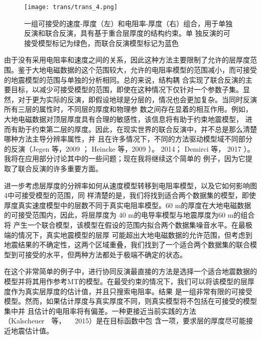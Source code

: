 \begin{figure}[H]
    \centering
    \texttt{[image: trans/trans\_4.png]}
    \caption[3.1.1]{一组可接受的速度-厚度（左）和电阻率-厚度（右）组合，用于单独反演和联合反演，具有基于重合层厚度的结构约束。单 独反演的可接受模型标记为绿色，而联合反演模型标记为蓝色}
\end{figure}


由于没有采用电阻率和速度之间的关系，因此这种方法主要限制了允许的层厚度范围。鉴于大地电磁数据的这个范围较大，允许的电阻率模型的范围减小，而可接受的地震模型的范围与单独的分析相同。总的来说，结构耦 合实现了联合反演的主要目标，以减少可接受模型的范围，即使在这种情况下仅针对一个参数子集。显然，对于更为实际的反演，即假设地球是分层的，情况也会更加复杂。当同时反演所有三层的属性时，不同层的厚度和物理参 数之间存在显着的相互作用。例如，大地电磁数据对顶层厚度具有合理的敏感性，该信息将有助于约束地震模型， 进而有助于约束第二层的厚度。因此，在现实世界的联合反演中，并不总是那么清楚哪种方法主导分辨率属性，并 且在许多情况下，不同的方法驱动模型域不同部分的反演（Jegen 等，2009 ； Heincke 等，2009 ）。 2014； Demirci 等， 2017 ）。我将在应用部分讨论其中的一些问题；现在我将继续这个简单的 例子，因为它提取了联合反演的许多重要方面。

进一步考虑层厚度的分辨率如何从速度模型转移到电阻率模型，以及它如何影响图4中可接受模型的范围，同 样清楚的是，我们将找到适合两个数据集的模型，即使厚度真实速度模型中的层数不同于真实电阻率模型。60 m的厚度在大地电磁数据的可接受范围内，因此，将层厚度为 40 m的电导率模型与地震厚度为60 m的组合将 产生一个联合模型，该模型在假设的范围内拟合两个数据集噪音水平。在最极端的情况下，真实地震模型的层厚 可能超出大地电磁数据的允许范围，但考虑到地震结果的不确定性，这两个区域重叠，我们找到了一个适合两个数据集的联合模型到可接受的水平，但两种方法都处于极端不确定的状态。

在这个非常简单的例子中，进行协同反演最直接的方法是选择一个适合地震数据的模型并将其用作参考MT的模型。在最受约束的情况下，我们可以将该模型的层厚度作为真实层厚度的估计值，并且只搜索电阻率。结果 是一组非常有限的可接受模型。然而，如果估计厚度与真实厚度不同，则真实模型将不包括在可接受的模型集中并 且估计的电阻率将有偏差。一种更接近当前实践的方法（Kalscheuer  等，   2015）是在目标函数中包 含一项，要求层的厚度尽可能接近地震估计值。

